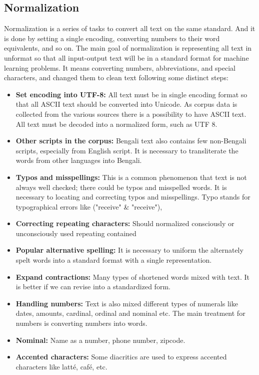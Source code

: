 \subsection{Normalization}

Normalization is a series of tasks to convert all text on the same standard. And it is done by setting a
single encoding, converting numbers to their word equivalents, and so on. The main goal of
normalization is representing all text in unformat so that all input-output text will be in a standard
format for machine learning problems. It means converting numbers, abbreviations, and special characters, and changed them to clean text following some distinct steps:
\begin{itemize}
    \item \textbf{Set encoding into UTF-8:} All text must be in single encoding format so that all ASCII text should be converted into Unicode. As corpus data is collected from the various sources there is a possibility to have ASCII text. All text must be decoded into a normalized form, such as UTF 8.
    \item \textbf{Other scripts in the corpus:} Bengali text also contains few non-Bengali scripts, especially from English script. It is necessary to transliterate the words from other languages into Bengali.
    \item \textbf{Typos and misspellings:} This is a common phenomenon that text is not always well checked; there could be typos and misspelled words. It is necessary to locating and correcting typos and misspellings. Typo stands for typographical errors like ("receive" \& "receive"),
    \item \textbf{Correcting repeating characters:} Should normalized consciously or unconsciously used repeating contained
    \item \textbf{Popular alternative spelling:} It is necessary to uniform the alternately spelt words into a standard format with a single representation.
    \item \textbf{Expand contractions:} Many types of shortened words mixed with text. It is better if we can revise into a standardized form.
    \item \textbf{Handling numbers:} Text is also mixed different types of numerals like dates, amounts, cardinal, ordinal and nominal etc. The main treatment for numbers is converting numbers into words.
    \item \textbf{Nominal:} Name as a number, phone number, zipcode.
    \item \textbf{Accented characters:} Some diacritics are used to express accented characters like latté, café, etc.
\end{itemize}